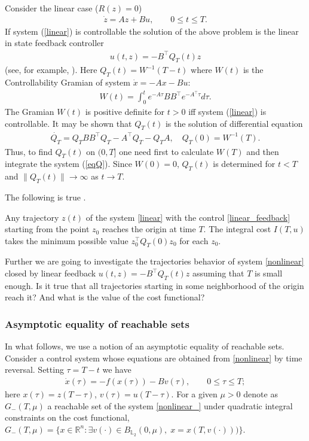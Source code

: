 \documentclass[../main.tex]{subfiles}
\begin{document}
Consider the linear case ($R(z)=0$)
\begin{gather}\label{linear}
	\dot{z} =  A  z + B u, \qquad 0 \leqslant t \leqslant T.
\end{gather}
If  system (\ref{linear}) is controllable the solution of the above problem  is the linear in state feedback controller 
\begin{gather}\label{linear_feedback}
	u(t,z) = -B^{\top} Q_T(t) z
\end{gather}
(see, for example, \cite{Abgar,Kur1,GusevOsipov}).
Here $Q_T(t)=W^{-1}(T-t)$ where $W(t)$ is the Controllability Gramian of system $\dot{x} = -A x - B u$:
\begin{gather*}
    W(t) = \int_0^t e^{-A\tau}BB^\top e^{-A^{\top}\tau}d\tau. 
\end{gather*}
The Gramian $W(t)$ is positive definite for $t>0$ iff  
system (\ref{linear}) is controllable. It may be shown that $Q_T(t)$ is the solution of differential equation 
\begin{gather}\label{eqQ}
	\dot{Q_T}  = Q_T B B^{\top} Q_T - A^{\top}Q_T - Q_T A, \quad Q_T(0)=W^{-1}(T).
\end{gather}
Thus, to find $Q_T(t)$ on  $(0,T]$ one need first to calculate $W(T)$ and then integrate the system (\ref{eqQ}).
Since $W(0)=0$, $Q_T(t)$ is determined for $t<T$ and 
$\|Q_T(t)\| \to \infty$ as $t\to T$. 

The following is true \cite{Abgar,Kur1,GusevOsipov}.
\begin{utv}
Any trajectory $z(t)$ of the system \eqref{linear} with the control \eqref{linear_feedback} starting from the point $ z_0 $ reaches the origin at time $T$. The  integral cost $I(T,u)$ takes the minimum possible value $z^{\top}_0 Q_T(0) z_0 $ for each $z_0$.
\end{utv}
Further we are going to investigate the trajectories behavior of system \eqref{nonlinear} closed by linear feedback $ u(t,z) = -B^{\top} Q_T(t) z$
assuming that $T$ is  small enough. Is it true that all trajectories starting in some neighborhood of the origin reach  it? And what is the value of the cost functional? 

\subsubsection{Asymptotic equality of reachable sets}

In what follows, we use a notion of an asymptotic equality of reachable sets. Consider a control system whose equations are obtained from \eqref{nonlinear} by time reversal. Setting $\tau=T-t$ we have
\begin{gather}\label{nonlinear_}
			\dot{x}(\tau)=-f(x(\tau))-B v(\tau),\qquad 0 \leqslant \tau \leqslant T; 
\end{gather}
here $x(\tau)=z(T-\tau)$, $v(\tau)=u(T-\tau)$.
For a given $\mu>0$ denote as $ G_{-} (T,\mu)$ a reachable set of the system \eqref{nonlinear_} under quadratic integral constraints on the cost functional, $G_{-}(T,\mu)=\{x\in \mathbb{R}^n:\exists v(\cdot)\in B_{\mathbb{L}_2}(0,\mu),\; x=x( T,v(\cdot)))\}$.
		 
\end{document}
